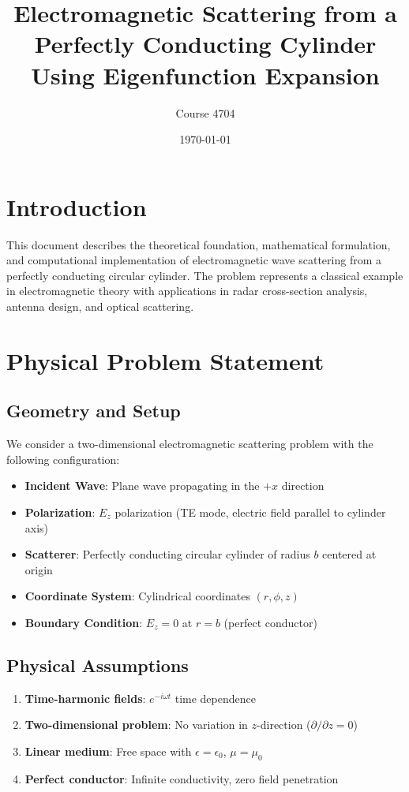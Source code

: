 \documentclass[11pt,a4paper]{article}
\title{Electromagnetic Scattering from a Perfectly Conducting Cylinder \\
       Using Eigenfunction Expansion}
\author{Course 4704}
\date{\today}
\begin{document}
\maketitle

\section{Introduction}

This document describes the theoretical foundation, mathematical formulation, and computational implementation of electromagnetic wave scattering from a perfectly conducting circular cylinder. The problem represents a classical example in electromagnetic theory with applications in radar cross-section analysis, antenna design, and optical scattering.

\section{Physical Problem Statement}

\subsection{Geometry and Setup}

We consider a two-dimensional electromagnetic scattering problem with the following configuration:

\begin{itemize}
\item \textbf{Incident Wave}: Plane wave propagating in the $+x$ direction
\item \textbf{Polarization}: $E_z$ polarization (TE mode, electric field parallel to cylinder axis)
\item \textbf{Scatterer}: Perfectly conducting circular cylinder of radius $b$ centered at origin
\item \textbf{Coordinate System}: Cylindrical coordinates $(r, \phi, z)$
\item \textbf{Boundary Condition}: $E_z = 0$ at $r = b$ (perfect conductor)
\end{itemize}

\subsection{Physical Assumptions}

\begin{enumerate}
\item \textbf{Time-harmonic fields}: $e^{-i\omega t}$ time dependence
\item \textbf{Two-dimensional problem}: No variation in $z$-direction ($\partial/\partial z = 0$)
\item \textbf{Linear medium}: Free space with $\epsilon = \epsilon_0$, $\mu = \mu_0$
\item \textbf{Perfect conductor}: Infinite conductivity, zero field penetration
\end{enumerate}
\end{document}
